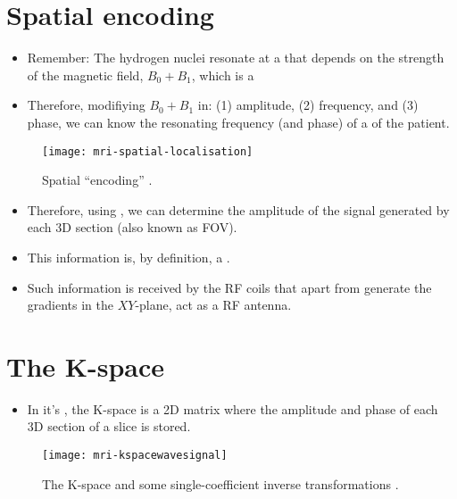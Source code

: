 \section{Spatial encoding}
\label{sec:spatial_encoding}
\begin{itemize}
\item Remember: The hydrogen nuclei resonate at a
   that depends on the strength of
  the magnetic field, $B_0+B_1$, which is a 
\item Therefore, modifiying $B_0+B_1$ in: (1) amplitude, (2)
  frequency, and (3) phase, we can know the resonating frequency (and
  phase) of a  of the patient.
\end{itemize}
\vspace{-4ex}
\begin{figure}[!b]
  \centering
  \texttt{[image: mri-spatial-localisation]}
  \caption{Spatial ``encoding'' \cite{abdulla2025MRI_encoding}.}
  \label{fig:MRI-encoding}
\end{figure}

\begin{itemize}
\item Therefore, using , we can determine the amplitude of the
  signal generated by each 3D section (also known as \gls{FOV}).
\item This information is, by definition, a .
\item Such information is received by the RF coils that apart from
  generate the gradients in the $XY$-plane, act as a RF antenna.
\end{itemize}

\section{The K-space}
\begin{itemize}
\item In it's , the K-space is a 2D matrix where the
  amplitude and phase of each 3D section of a slice is stored.
\end{itemize}
\vspace{-4ex}
\begin{figure}[!b]
  \centering
  \texttt{[image: mri-kspacewavesignal]}
  \caption{The K-space and some single-coefficient inverse transformations \cite{abdulla2025MRI_Kspace}.}
  \label{fig:MRI-Kspace}
\end{figure}

